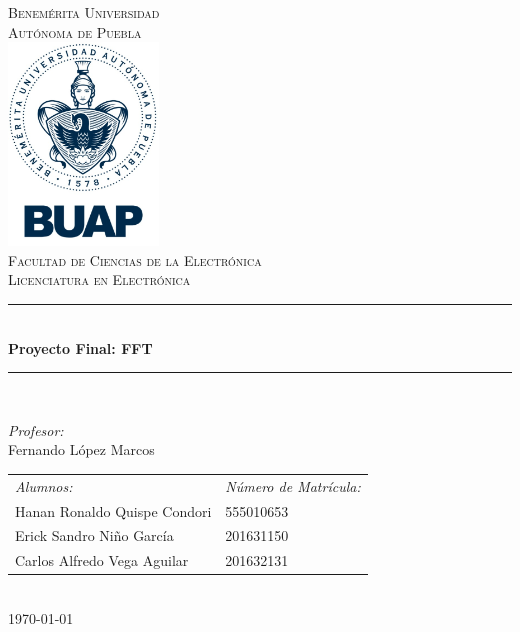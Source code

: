 \documentclass[12pt]{article}
\date{\today}
\begin{document}
\begin{titlepage}
\newcommand{\HRule}{\rule{\linewidth}{0.5mm}} 
\center
\textsc{\LARGE  Benemérita Universidad \\[0.2cm] Autónoma de Puebla}\\[1.5cm] 
\includegraphics[width=4cm]{escudo.jpg}\\[1cm]
\textsc{\Large Facultad de Ciencias de la Electrónica}\\[0.5cm] 
\textsc{\large Licenciatura en Electrónica}\\[0.5cm]
\HRule \\[0.4cm]
{ \huge \bfseries Proyecto Final: FFT}\\[0.4cm] 
\HRule \\[1.5cm]
\begin{minipage}{\textwidth}
\center 

\emph{Profesor:} \\
Fernando López Marcos \\[1cm]

\begin{tabular}{ll}
\emph{Alumnos:} & \emph{Número de Matrícula:}\\
Hanan Ronaldo Quispe Condori  & 555010653 \\
Erick Sandro Niño García & 201631150\\
Carlos Alfredo Vega Aguilar & 201632131 \\
\end{tabular}
\end{minipage}\\[2cm]
\today
\end{titlepage}



\end{document}

